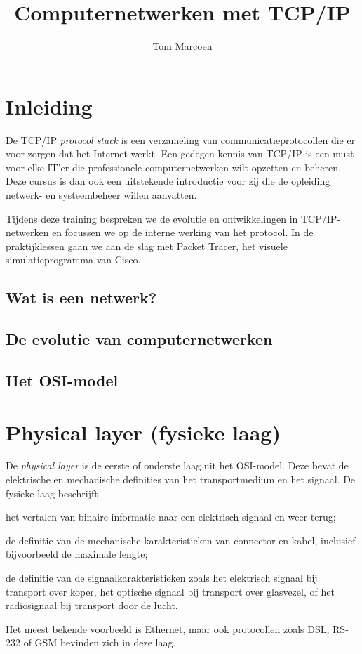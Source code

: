 \documentclass[a4paper,12pt]{memoir}
\title{Computernetwerken met TCP/IP}
\author{Tom Marcoen}
\begin{document}
\frontmatter
\maketitle
\thispagestyle{empty}

\chapter{Inleiding}

De TCP/IP \emph{protocol stack} is een verzameling van communicatieprotocollen die er voor zorgen dat het Internet werkt.
Een gedegen kennis van TCP/IP is een must voor elke IT'er die professionele computernetwerken wilt opzetten en beheren.
Deze cursus is dan ook een uitstekende introductie voor zij die de opleiding netwerk- en systeembeheer willen aanvatten.

Tijdens deze training bespreken we de evolutie en ontwikkelingen in TCP/IP-netwerken en focussen we op de interne werking van het protocol.
In de praktijklessen gaan we aan de slag met Packet Tracer, het visuele simulatieprogramma van Cisco.

\section{Wat is een netwerk?}


\section{De evolutie van computernetwerken}

\section{Het OSI-model}

\clearforchapter
\tableofcontents

\mainmatter
\chapter{Physical layer (fysieke laag)}

De \emph{physical layer} is de eerste of onderste laag uit het OSI-model.
Deze bevat de elektrische en mechanische definities van het transportmedium en het signaal.
De fysieke laag beschrijft
\begin{inlinelist}
\item het vertalen van binaire informatie naar een elektrisch signaal en weer terug;
\item de definitie van de mechanische karakteristieken van connector en kabel, inclusief bijvoorbeeld de maximale lengte;
\item de definitie van de signaalkarakteristieken zoals het elektrisch signaal bij transport over koper, het optische signaal bij transport over glasvezel, of het radiosignaal bij transport door de lucht.
\end{inlinelist}
Het meest bekende voorbeeld is Ethernet, maar ook protocollen zoals DSL, RS-232 of GSM bevinden zich in deze laag.
\end{document}
